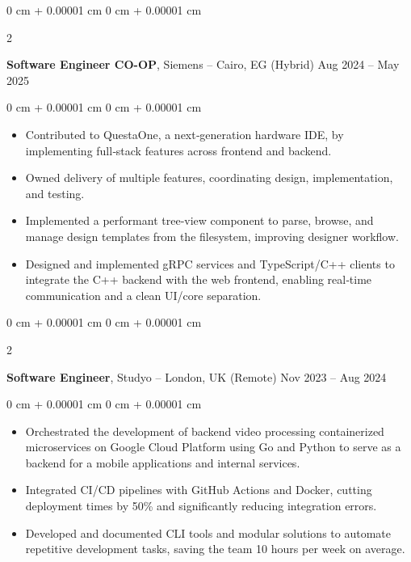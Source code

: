 \documentclass[10pt, letterpaper]{article}
\newenvironment{highlights}{
    \begin{itemize}[
        topsep=0.10 cm,
        parsep=0.10 cm,
        partopsep=0pt,
        itemsep=0pt,
        leftmargin=0 cm + 10pt
    ]
}{
    \end{itemize}
} %
\newenvironment{onecolentry}{
    \begin{adjustwidth}{
        0 cm + 0.00001 cm
    }{
        0 cm + 0.00001 cm
    }
}{
    \end{adjustwidth}
} %
\newenvironment{twocolentry}[2][]{
    \onecolentry
    \def\secondColumn{#2}
    \setcolumnwidth{\fill, 4.5 cm}
    \begin{paracol}{2}
}{
    \switchcolumn \raggedleft \secondColumn
    \end{paracol}
    \endonecolentry
} %
\begin{document}
\vspace{0.4 cm}

\begin{twocolentry}{
        Aug 2024 – May 2025
    }
    \textbf{Software Engineer CO-OP}, Siemens -- Cairo, EG (Hybrid)\end{twocolentry}

\vspace{0.10 cm}
\begin{onecolentry}
    \begin{highlights}
        \item Contributed to QuestaOne, a next‑generation hardware IDE, by implementing full‑stack features across frontend and backend.
        \item Owned delivery of multiple features, coordinating design, implementation, and testing.
        \item Implemented a performant tree‑view component to parse, browse, and manage design templates from the filesystem, improving designer workflow.
        \item Designed and implemented gRPC services and TypeScript/C++ clients to integrate the C++ backend with the web frontend, enabling real‑time communication and a clean UI/core separation.
    \end{highlights}
\end{onecolentry}


\vspace{0.4 cm}

\begin{twocolentry}{
        Nov 2023 – Aug 2024
    }
    \textbf{Software Engineer}, Studyo -- London, UK (Remote)\end{twocolentry}

\vspace{0.10 cm}
\begin{onecolentry}
    \begin{highlights}
        \item Orchestrated the development of backend video processing containerized microservices on Google Cloud Platform using Go and Python to serve as a backend for a mobile applications and internal services.
        \item Integrated CI/CD pipelines with GitHub Actions and Docker, cutting deployment times by 50\% and significantly reducing integration errors.
        \item Developed and documented CLI tools and modular solutions to automate repetitive development tasks, saving the team 10 hours per week on average.
    \end{highlights}
\end{onecolentry}
\end{document}
